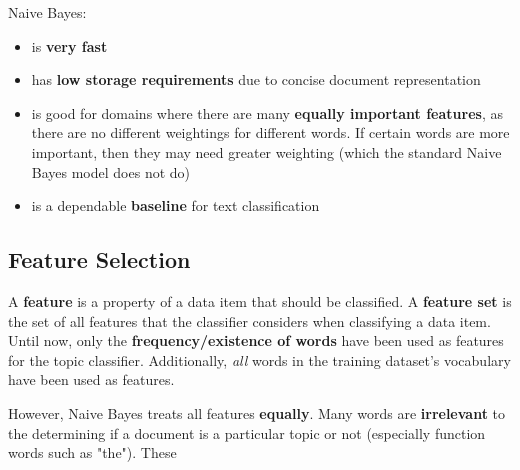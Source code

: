 \documentclass{article}
\begin{document}
Naive Bayes:
\begin{itemize}
	\item is \textbf{very fast}
	\item has \textbf{low storage requirements} due to concise document representation
	\item is good for domains where there are many \textbf{equally important features}, as there are no different weightings for different words. If certain words are more important, then they may need greater weighting (which the standard Naive Bayes model does not do)
	\item is a dependable \textbf{baseline} for text classification
\end{itemize}

\subsection{Feature Selection}

A \textbf{feature} is a property of a data item that should be classified.	A \textbf{feature set} is the set of all features that the classifier considers when classifying a data item. Until now, only the \textbf{frequency/existence of words} have been used as features for the topic classifier. Additionally, \textit{all} words in the training dataset's vocabulary have been used as features.

However, Naive Bayes treats all features \textbf{equally}. Many words are \textbf{irrelevant} to the determining if a document is a particular topic or not (especially function words such as "the"). These 
\end{document}
